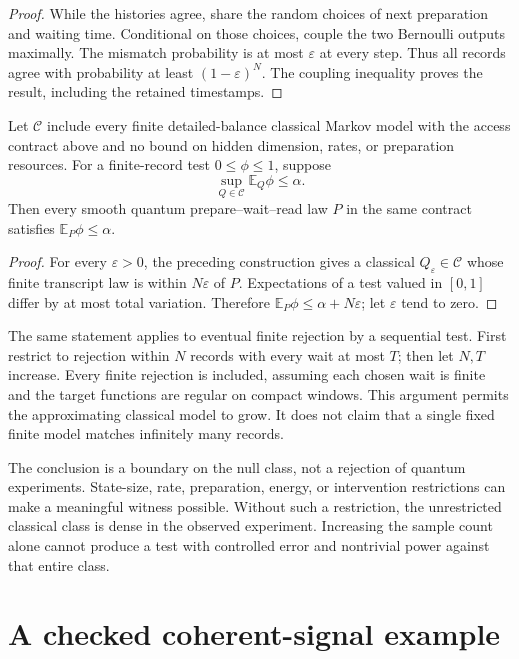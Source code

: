 \begin{proof}
While the histories agree, share the random choices of next preparation and
waiting time. Conditional on those choices, couple the two Bernoulli outputs
maximally. The mismatch probability is at most $\varepsilon$ at every step.
Thus all records agree with probability at least $(1-\varepsilon)^N$.
The coupling inequality proves the result, including the retained timestamps.
\end{proof}

\begin{corollary}
\label{rf:closure-nogo}
Let $\mathcal C$ include every finite detailed-balance classical Markov model
with the access contract above and no bound on hidden dimension, rates, or
preparation resources. For a finite-record test $0\le\phi\le1$, suppose
\[
 \sup_{Q\in\mathcal C}\mathbb E_Q\phi\le\alpha.
\]
Then every smooth quantum prepare--wait--read law $P$ in the same contract
satisfies $\mathbb E_P\phi\le\alpha$.
\end{corollary}

\begin{proof}
For every $\varepsilon>0$, the preceding construction gives a classical
$Q_\varepsilon\in\mathcal C$ whose finite transcript law is within
$N\varepsilon$ of $P$. Expectations of a test valued in $[0,1]$ differ by at
most total variation. Therefore
$\mathbb E_P\phi\le\alpha+N\varepsilon$; let $\varepsilon$ tend to zero.
\end{proof}

The same statement applies to eventual finite rejection by a sequential test.
First restrict to rejection within $N$ records with every wait at most $T$;
then let $N,T$ increase. Every finite rejection is included, assuming each
chosen wait is finite and the target functions are regular on compact windows.
This argument permits the approximating classical model to grow. It does not
claim that a single fixed finite model matches infinitely many records.

The conclusion is a boundary on the null class, not a rejection of quantum
experiments. State-size, rate, preparation, energy, or intervention restrictions
can make a meaningful witness possible. Without such a restriction, the
unrestricted classical class is dense in the observed experiment. Increasing
the sample count alone cannot produce a test with controlled error and
nontrivial power against that entire class.

\section{A checked coherent-signal example}

